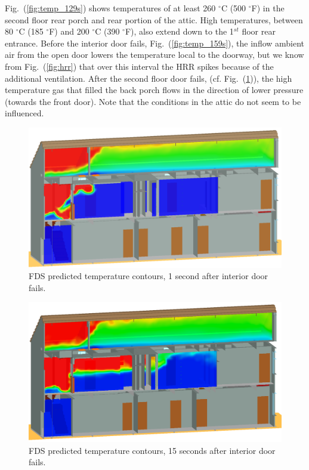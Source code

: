 \documentclass[11pt,oneside]{book}
\begin{document}
Fig.~(\ref{fig:temp_129s}) shows temperatures of at least 260 $^{\circ}$C (500 $^{\circ}$F) in the second floor rear porch and rear portion of the attic. High temperatures, between 80 $^{\circ}$C (185 $^{\circ}$F) and 200 $^{\circ}$C (390 $^{\circ}$F), also extend down to the 1$^{st}$ floor rear entrance. Before the interior door fails, Fig.~(\ref{fig:temp_159s}), the inflow ambient air from the open door lowers the temperature local to the doorway, but we know from Fig.~(\ref{fig:hrr}) that over this interval the HRR spikes because of the additional ventilation. After the second floor door fails, (cf. Fig.~(\ref{fig:temp_161s})), the high temperature gas that filled the back porch flows in the direction of lower pressure (towards the front door). Note that the conditions in the attic do not seem to be influenced.
\begin{figure}[!ht]
\includegraphics[width=.675\textwidth]{../Figures/west_50th_baseline_161}
 

\caption{FDS predicted temperature contours, 1 second after interior door fails.}
\label{fig:temp_161s}
\end{figure}

\begin{figure}[!ht]
\includegraphics[width=.675\textwidth]{../Figures/west_50th_baseline_175}
 

\caption{FDS predicted temperature contours, 15 seconds after interior door fails.}
\label{fig:temp_175s}
\end{figure}
\end{document}
